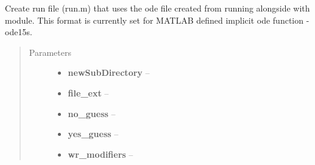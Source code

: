 \documentclass[letterpaper,10pt,english]{sphinxmanual}
\begin{document}
\begin{fulllineitems}
\begin{fulllineitems}
\label{eqparse:eqparse.matlabparser.MatlabParser.multi_paramfile}
\end{fulllineitems}


\begin{fulllineitems}
\label{eqparse:eqparse.matlabparser.MatlabParser.multi_runfile}
Create run file (run.m) that uses the ode file created from running alongside with  module. This format is currently set for MATLAB defined implicit ode function - ode15s.
\begin{quote}\begin{description}
\item[{Parameters}] \leavevmode\begin{itemize}
\item {} 
\textbf{newSubDirectory} -- 

\item {} 
\textbf{file\_ext} -- 

\item {} 
\textbf{no\_guess} -- 

\item {} 
\textbf{yes\_guess} -- 

\item {} 
\textbf{wr\_modifiers} -- 

\end{itemize}

\end{description}\end{quote}

\end{fulllineitems}


\begin{fulllineitems}
\label{eqparse:eqparse.matlabparser.MatlabParser.multi_runfile_slider}
\end{fulllineitems}


\end{fulllineitems}
\end{document}
